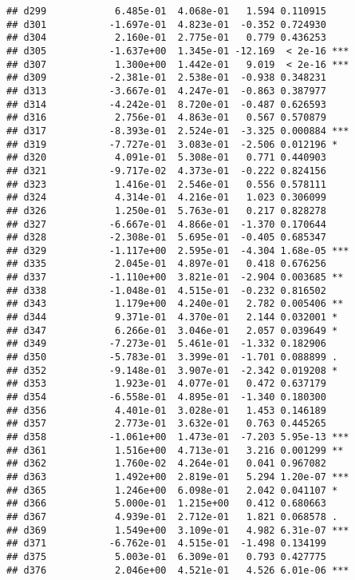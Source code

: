 \documentclass[
]{article}
\begin{document}
\begin{verbatim}
## d299            6.485e-01  4.068e-01   1.594 0.110915    
## d301           -1.697e-01  4.823e-01  -0.352 0.724930    
## d304            2.160e-01  2.775e-01   0.779 0.436253    
## d305           -1.637e+00  1.345e-01 -12.169  < 2e-16 ***
## d307            1.300e+00  1.442e-01   9.019  < 2e-16 ***
## d309           -2.381e-01  2.538e-01  -0.938 0.348231    
## d313           -3.667e-01  4.247e-01  -0.863 0.387977    
## d314           -4.242e-01  8.720e-01  -0.487 0.626593    
## d316            2.756e-01  4.863e-01   0.567 0.570879    
## d317           -8.393e-01  2.524e-01  -3.325 0.000884 ***
## d319           -7.727e-01  3.083e-01  -2.506 0.012196 *  
## d320            4.091e-01  5.308e-01   0.771 0.440903    
## d321           -9.717e-02  4.373e-01  -0.222 0.824156    
## d323            1.416e-01  2.546e-01   0.556 0.578111    
## d324            4.314e-01  4.216e-01   1.023 0.306099    
## d326            1.250e-01  5.763e-01   0.217 0.828278    
## d327           -6.667e-01  4.866e-01  -1.370 0.170644    
## d328           -2.308e-01  5.695e-01  -0.405 0.685347    
## d329           -1.117e+00  2.595e-01  -4.304 1.68e-05 ***
## d335            2.045e-01  4.897e-01   0.418 0.676256    
## d337           -1.110e+00  3.821e-01  -2.904 0.003685 ** 
## d338           -1.048e-01  4.515e-01  -0.232 0.816502    
## d343            1.179e+00  4.240e-01   2.782 0.005406 ** 
## d344            9.371e-01  4.370e-01   2.144 0.032001 *  
## d347            6.266e-01  3.046e-01   2.057 0.039649 *  
## d349           -7.273e-01  5.461e-01  -1.332 0.182906    
## d350           -5.783e-01  3.399e-01  -1.701 0.088899 .  
## d352           -9.148e-01  3.907e-01  -2.342 0.019208 *  
## d353            1.923e-01  4.077e-01   0.472 0.637179    
## d354           -6.558e-01  4.895e-01  -1.340 0.180300    
## d356            4.401e-01  3.028e-01   1.453 0.146189    
## d357            2.773e-01  3.632e-01   0.763 0.445265    
## d358           -1.061e+00  1.473e-01  -7.203 5.95e-13 ***
## d361            1.516e+00  4.713e-01   3.216 0.001299 ** 
## d362            1.760e-02  4.264e-01   0.041 0.967082    
## d363            1.492e+00  2.819e-01   5.294 1.20e-07 ***
## d365            1.246e+00  6.098e-01   2.042 0.041107 *  
## d366            5.000e-01  1.215e+00   0.412 0.680663    
## d367            4.939e-01  2.712e-01   1.821 0.068578 .  
## d369            1.549e+00  3.109e-01   4.982 6.31e-07 ***
## d371           -6.762e-01  4.515e-01  -1.498 0.134199    
## d375            5.003e-01  6.309e-01   0.793 0.427775    
## d376            2.046e+00  4.521e-01   4.526 6.01e-06 ***

\end{verbatim}
\end{document}
